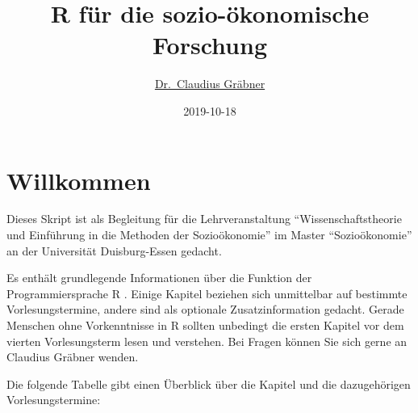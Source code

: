 \documentclass[]{tufte-book}
\title{R für die sozio-ökonomische Forschung}
\author{\href{http://claudius-graebner.com/}{Dr.~Claudius Gräbner}}
\date{2019-10-18}
\begin{document}
\maketitle



{
\setcounter{tocdepth}{1}
\tableofcontents
}

\chapter*{Willkommen}\label{willkommen}

Dieses Skript ist als Begleitung für die Lehrveranstaltung
``Wissenschaftstheorie und Einführung in die Methoden der
Sozioökonomie'' im Master ``Sozioökonomie'' an der Universität
Duisburg-Essen gedacht.

Es enthält grundlegende Informationen über die Funktion der
Programmiersprache R \citep{R-Team}. Einige Kapitel beziehen sich
unmittelbar auf bestimmte Vorlesungstermine, andere sind als optionale
Zusatzinformation gedacht. Gerade Menschen ohne Vorkenntnisse in R
sollten unbedingt die ersten Kapitel vor dem vierten Vorlesungsterm
lesen und verstehen. Bei Fragen können Sie sich gerne an Claudius
Gräbner wenden.

Die folgende Tabelle gibt einen Überblick über die Kapitel und die
dazugehörigen Vorlesungstermine:
\end{document}
